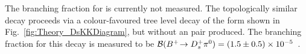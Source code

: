 The branching fraction for \decay{\Bp}{\Dsp\Kp\Km} is currently not measured. The topologically similar decay \decay{\Bp}{\Dsp \piz} proceeds via a colour-favoured tree level decay of the form shown in Fig.~\ref{fig:Theory_DsKKDiagram}, but without an \squark\squarkbar pair produced. The branching fraction for this decay is measured to be $\mathcal{B}({{{B}^+}}\!\rightarrow {\ensuremath{{D}^+_{s}}} {\ensuremath{{\pi}^0}}) = (1.5 \pm 0.5) \times 10^{-5}$~\cite{Aubert:2006xy}. 






